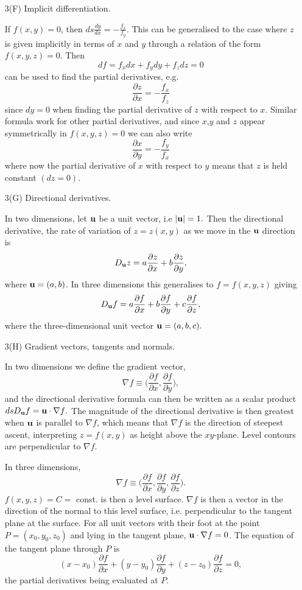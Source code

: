 \documentclass{article}
\begin{document}
\begin{enumerate}
\item[3(F)]  Implicit differentiation.

If $f(x,y)=0$, then ${ds \frac{dy}{dx} = - \frac{f_x}{f_y} }$. This
can be generalised to the case where $z$ is given implicitly in terms
of $x$ and $y$ through a relation of the form $f(x,y,z)=0$.
Then
$$df = f_x dx + f_y dy + f_z dz =0$$
can be used to find the partial derivatives, e.g.
$$ \frac{\partial z} {\partial x} = - \frac{f_x}{f_z}$$
since $dy=0$ when finding the partial derivative of $z$ with
respect to $x$. Similar formula work for other partial derivatives,
and since $x$,$y$ and $z$ appear symmetrically in $f(x,y,z)=0$
we can also write
$$ \frac{\partial x} {\partial y} = - \frac{f_y}{f_x}$$
where now the partial derivative of $x$ with respect to $y$
means that $z$ is held constant $( dz =0)$.

\item[3(G)]  Directional derivatives.

In two dimensions, let $\bf u$ be a unit vector, i.e $|{\bf u}| = 1.$
Then the directional derivative, the rate of variation of $z = z(x,y)$
as we move in the $\bf u$ direction is
$$ D_{\bf u} z = a \frac{\partial z} {\partial x} +
b \frac{\partial z} {\partial y},$$
where ${\bf u} = (a,b)$. In three dimensions this generalises to
$f=f(x,y,z)$ giving
$$ D_{\bf u} f = a \frac{\partial f} {\partial x} +
b \frac{\partial f} {\partial y} + c \frac{\partial f} {\partial z} ,$$
where the three-dimensional unit vector ${\bf u} = (a,b,c).$

\item[3(H)]  Gradient vectors, tangents and normals.

In two dimensions we define the gradient vector,
$$ \nabla f \equiv \Bigr( \frac{\partial f} {\partial x},
\frac{\partial f} {\partial y} \Bigr), $$
and the directional derivative formula can then be written
as a scalar product
${ds D_{\bf u} f = {\bf u} \cdot \nabla f }.$ The magnitude
of the directional derivative is then greatest when $\bf u$
is parallel to $\nabla f$, which means that $\nabla f$ is
the direction of steepest ascent, interpreting $z=f(x,y)$ as
height above the $xy$-plane. Level contours are perpendicular
to $\nabla f$.

In three dimensions,
$$ \nabla f \equiv \Bigr(\frac{\partial f} {\partial x},
\frac{\partial f} {\partial y}, \frac{\partial f} {\partial z} \Bigr). $$
$f(x,y,z)=C=$ const. is then a level surface. $\nabla f$ is then
a vector in the direction of the normal to this level surface, i.e.
perpendicular to the tangent plane at the surface. For all unit
vectors with their foot at the point $P = (x_0,y_0,z_0)$ and
lying in the tangent plane, ${\bf u} \cdot \nabla f = 0$.
The equation of the tangent plane through $P$ is
$$ (x-x_0) \frac{\partial f} {\partial x}
+(y-y_0) \frac{\partial f} {\partial y}
+ (z-z_0) \frac{\partial f} {\partial z}=0, $$
the partial derivatives being evaluated at $P$.
\end{enumerate}
\end{document}
